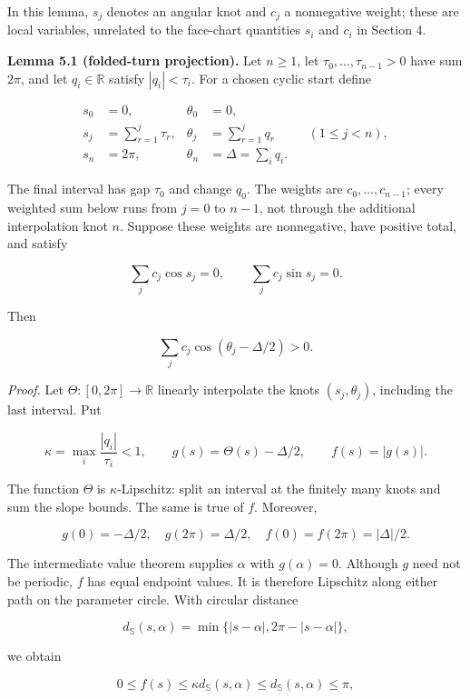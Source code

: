 \documentclass[
  11pt,
  letterpaper,
]{article}
\begin{document}
In this lemma, \(s_j\) denotes an angular knot and \(c_j\) a nonnegative
weight; these are local variables, unrelated to the face-chart
quantities \(s_i\) and \(c_i\) in Section 4.

\textbf{Lemma 5.1 (folded-turn projection).} Let \(n\ge1\), let
\(\tau_0,\ldots,\tau_{n-1}>0\) have sum \(2\pi\), and let
\(q_i\in\mathbb R\) satisfy \(|q_i|<\tau_i\). For a chosen cyclic start
define

\[
\begin{aligned}
s_0&=0,&\theta_0&=0,\\
s_j&=\sum_{r=1}^j\tau_r,&\theta_j&=\sum_{r=1}^jq_r
&& (1\le j<n),\\
s_n&=2\pi,&\theta_n&=\Delta=\sum_iq_i.
\end{aligned}
\tag{5.1}
\]

The final interval has gap \(\tau_0\) and change \(q_0\). The weights
are \(c_0,\ldots,c_{n-1}\); every weighted sum below runs from \(j=0\)
to \(n-1\), not through the additional interpolation knot \(n\). Suppose
these weights are nonnegative, have positive total, and satisfy

\[
\sum_j c_j\cos s_j=0,\qquad \sum_j c_j\sin s_j=0.
\tag{5.2}
\]

Then

\[
\sum_jc_j\cos(\theta_j-\Delta/2)>0.
\tag{5.3}
\]

\emph{Proof.} Let \(\Theta:[0,2\pi]\to\mathbb R\) linearly interpolate
the knots \((s_j,\theta_j)\), including the last interval. Put

\[
\kappa=\max_i\frac{|q_i|}{\tau_i}<1,
\qquad g(s)=\Theta(s)-\Delta/2,
\qquad f(s)=|g(s)|.
\]

The function \(\Theta\) is \(\kappa\)-Lipschitz: split an interval at
the finitely many knots and sum the slope bounds. The same is true of
\(f\). Moreover,

\[
g(0)=-\Delta/2,\quad g(2\pi)=\Delta/2,
\quad f(0)=f(2\pi)=|\Delta|/2.
\]

The intermediate value theorem supplies \(\alpha\) with \(g(\alpha)=0\).
Although \(g\) need not be periodic, \(f\) has equal endpoint values. It
is therefore Lipschitz along either path on the parameter circle. With
circular distance

\[
d_{\mathbb S}(s,\alpha)=\min\{|s-\alpha|,2\pi-|s-\alpha|\},
\]

we obtain

\[
0\le f(s)\le\kappa d_{\mathbb S}(s,\alpha)
\le d_{\mathbb S}(s,\alpha)\le\pi,
\tag{5.4}
\]
\end{document}
